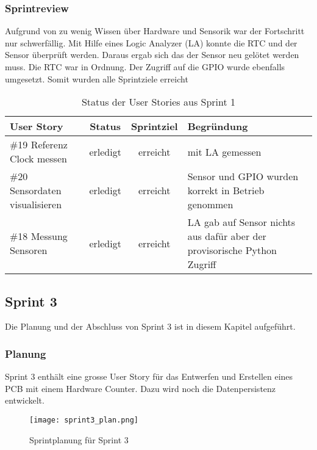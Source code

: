 \subsubsection*{Sprintreview}
Aufgrund von zu wenig Wissen über Hardware und Sensorik war der Fortschritt nur schwerfällig. Mit Hilfe eines Logic Analyzer (LA) konnte die RTC und der Sensor überprüft werden. Daraus ergab sich das der Sensor neu gelötet werden muss. Die RTC war in Ordnung. Der Zugriff auf die GPIO wurde ebenfalls umgesetzt. Somit wurden alle Sprintziele erreicht
\begin{table}[H]
    \centering
    \begin{tabular}{lccp{7cm}}
        \textbf{User Story} &  \textbf{Status} & \textbf{Sprintziel}& \textbf{Begründung}\\\toprule[2pt]
        \#19 Referenz Clock messen & erledigt & erreicht & mit LA gemessen\\
        \#20 Sensordaten visualisieren & erledigt & erreicht & Sensor und GPIO wurden korrekt in Betrieb genommen\\
        \#18 Messung Sensoren & erledigt & erreicht & LA gab auf Sensor nichts aus dafür aber der provisorische Python Zugriff\\
    \end{tabular}
    \caption{Status der User Stories aus Sprint 1}
\end{table}

\clearpage
\subsection*{Sprint 3}
Die Planung und der Abschluss von Sprint 3 ist in diesem Kapitel aufgeführt.
\subsubsection*{Planung}
Sprint 3 enthält eine grosse User Story für das Entwerfen und Erstellen eines PCB mit einem Hardware Counter. Dazu wird noch die Datenpersistenz entwickelt.
\begin{figure}[H]
    \centering
    \texttt{[image: sprint3\_plan.png]}
    \caption{Sprintplanung für Sprint 3}
\end{figure}
